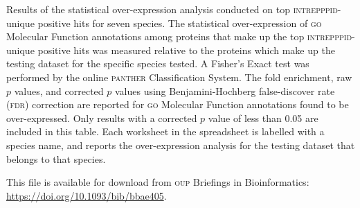\begin{displayquote}
\begin{singlespace}
Results of the statistical over-expression analysis conducted on top \textsc{intrepppid}-unique positive hits for seven species. The statistical over-expression of \textsc{go} Molecular Function annotations among proteins that make up the top \textsc{intrepppid}-unique positive hits was measured relative to the proteins which make up the testing dataset for the specific species tested. A Fisher's Exact test was performed by the online \textsc{panther} Classification System. The fold enrichment, raw $p$ values, and corrected $p$ values using Benjamini-Hochberg false-discover rate (\textsc{fdr}) correction are reported for \textsc{go} Molecular Function annotations found to be over-expressed. Only results with a corrected $p$ value of less than 0.05 are included in this table. Each worksheet in the spreadsheet is labelled with a species name, and reports the over-expression analysis for the testing dataset that belongs to that species.
\end{singlespace}
\end{displayquote}

\begin{tcolorbox}
    This file is available for download from \textsc{oup} Briefings in Bioinformatics:\\ \href{https://doi.org/10.1093/bib/bbae405}{https://doi.org/10.1093/bib/bbae405}.
\end{tcolorbox}

\newpage

